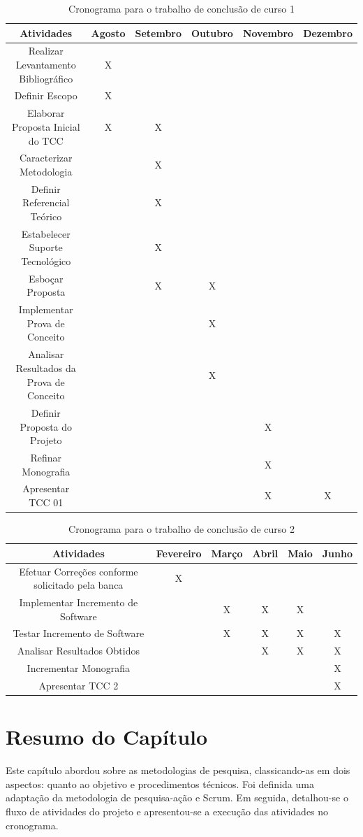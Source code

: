 \begin{table}[h]
  \tiny
  \centering
  \caption{Cronograma para o trabalho de conclusão de curso 1}
  \label{cronograma-tcc-1}
  \begin{tabular}{| c | c | c | c | c | c |}
    \hline
    Atividades & Agosto & Setembro & Outubro & Novembro & Dezembro \\ \hline
    Realizar Levantamento Bibliográfico & X &  &  &  &  \\
    Definir Escopo & X &  &  &  &  \\
    Elaborar Proposta Inicial do TCC & X & X &  &  &  \\
    Caracterizar Metodologia &  & X &  &  &  \\
    Definir Referencial Teórico &  & X &  &  &  \\
    Estabelecer Suporte Tecnológico &  & X &  &  &  \\
    Esboçar Proposta &  & X & X &  &  \\
    Implementar Prova de Conceito &  &  & X &  &  \\
    Analisar Resultados da Prova de Conceito &  &  & X &  &  \\
    Definir Proposta do Projeto &  &  &  & X &  \\
    Refinar Monografia &  &  &  & X &  \\
    Apresentar TCC 01 &  &  &  & X & X \\ \hline
  \end{tabular}
\end{table}
  
\begin{table}[h]
  \tiny
  \centering
  \caption{Cronograma para o trabalho de conclusão de curso 2}
  \label{cronograma-tcc-2}
  \begin{tabular}{| c | c | c | c | c | c |}
  \hline
    Atividades & Fevereiro & Março & Abril & Maio & Junho \\ \hline
    Efetuar Correções conforme solicitado pela banca & X &  &  &  &  \\
    Implementar Incremento de Software &  & X & X & X &  \\
    Testar Incremento de Software &  & X & X & X & X \\
    Analisar Resultados Obtidos &  &  & X & X & X \\
    Incrementar Monografia &  &  &  &  & X \\
    Apresentar TCC 2 &  &  &  &  & X \\ \hline
  \end{tabular}
\end{table}
  
  \section{Resumo do Capítulo}
  Este capítulo abordou sobre as metodologias de pesquisa, classicando-as em dois aspectos: quanto ao objetivo e procedimentos técnicos. Foi definida uma adaptação da metodologia de pesquisa-ação e Scrum. Em seguida, detalhou-se o fluxo de atividades do projeto e apresentou-se a execução das atividades no cronograma.